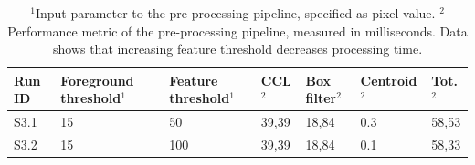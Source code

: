 \documentclass[12pt]{report}
\begin{document}
\begin{table}[!h]
    \centering
    \begin{tabular}{|p{0.8cm}|p{2.5cm}|p{2cm}||p{1.25cm}|p{1.25cm}|p{1.9cm}|p{1cm}|}
        \hline
        \textbf{Run ID}&\textbf{Foreground threshold$^{1}$}&\textbf{Feature threshold$^{1}$}&\textbf{CCL$^{2}$}&\textbf{Box filter$^{2}$}&\textbf{Centroid$^{2}$}&\textbf{Tot.$^{2}$}\\
        \hline
        \hline
        S3.1&15&50&39,39&18,84&0.3&58,53\\
        \hline
        S3.2&15&100&39,39&18,84&0.1&58,33\\
        \hline
    \end{tabular}
    \caption{$^{1}$Input parameter to the pre-processing pipeline, specified as pixel value. $^{2}$Performance metric of the pre-processing pipeline, measured in milliseconds. Data shows that increasing feature threshold decreases processing time.}
    \label{table:s2_res}
\end{table}
\end{document}
